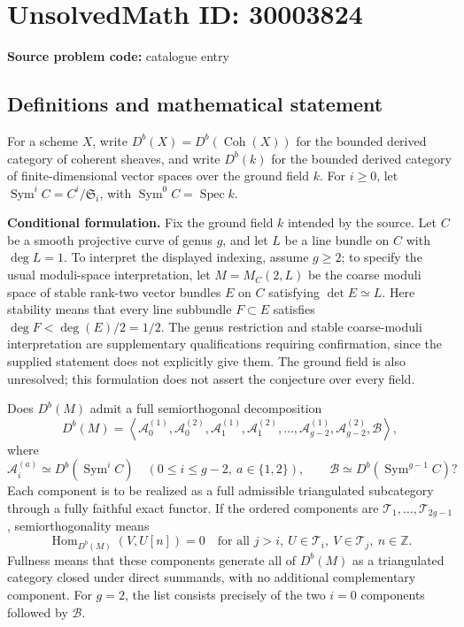 \documentclass[11pt]{article}
\newcommand{\Z}{\mathbb{Z}}
\begin{document}
\section*{UnsolvedMath ID: 30003824}
\textbf{Source problem code:} catalogue entry
\subsection{Definitions and mathematical statement}
For a scheme \(X\), write \(D^b(X)=D^b(\operatorname{Coh}(X))\) for the bounded derived category of coherent sheaves, and write \(D^b(k)\) for the bounded derived category of finite-dimensional vector spaces over the ground field \(k\). For \(i\geq 0\), let \(\operatorname{Sym}^i C=C^i/\mathfrak S_i\), with \(\operatorname{Sym}^0 C=\operatorname{Spec}k\).

\textbf{Conditional formulation.} Fix the ground field \(k\) intended by the source. Let \(C\) be a smooth projective curve of genus \(g\), and let \(L\) be a line bundle on \(C\) with \(\deg L=1\). To interpret the displayed indexing, assume \(g\geq 2\); to specify the usual moduli-space interpretation, let \(M=M_C(2,L)\) be the coarse moduli space of stable rank-two vector bundles \(E\) on \(C\) satisfying \(\det E\simeq L\). Here stability means that every line subbundle \(F\subset E\) satisfies \(\deg F<\deg(E)/2=1/2\). The genus restriction and stable coarse-moduli interpretation are supplementary qualifications requiring confirmation, since the supplied statement does not explicitly give them. The ground field is also unresolved; this formulation does not assert the conjecture over every field.

Does \(D^b(M)\) admit a full semiorthogonal decomposition
\[
D^b(M)=\left\langle
\mathcal A_0^{(1)},\mathcal A_0^{(2)},
\mathcal A_1^{(1)},\mathcal A_1^{(2)},\ldots,
\mathcal A_{g-2}^{(1)},\mathcal A_{g-2}^{(2)},
\mathcal B
\right\rangle,
\]
where
\[
\mathcal A_i^{(a)}\simeq D^b(\operatorname{Sym}^i C)
\quad(0\leq i\leq g-2,\ a\in\{1,2\}),
\qquad
\mathcal B\simeq D^b(\operatorname{Sym}^{g-1}C)?
\]
Each component is to be realized as a full admissible triangulated subcategory through a fully faithful exact functor. If the ordered components are \(\mathcal T_1,\ldots,\mathcal T_{2g-1}\), semiorthogonality means
\[
\operatorname{Hom}_{D^b(M)}(V,U[n])=0
\quad\text{for all }j>i,\ U\in\mathcal T_i,\ V\in\mathcal T_j,\ n\in\Z.
\]
Fullness means that these components generate all of \(D^b(M)\) as a triangulated category closed under direct summands, with no additional complementary component. For \(g=2\), the list consists precisely of the two \(i=0\) components followed by \(\mathcal B\).
\end{document}
